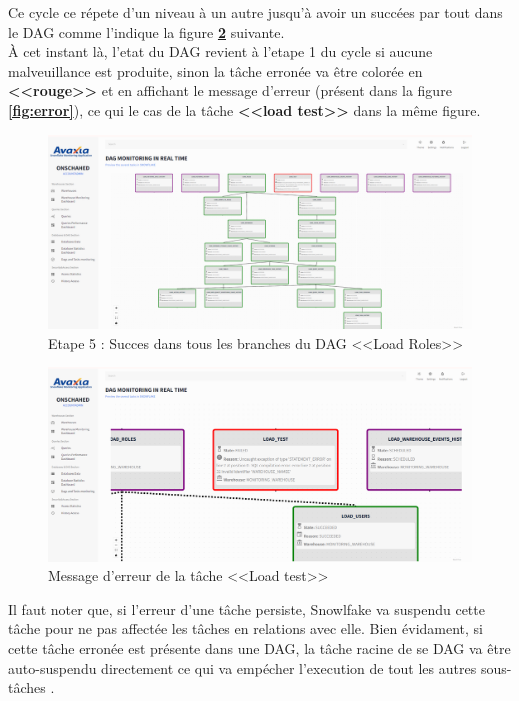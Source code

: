 \par Ce cycle ce répete d'un niveau à un autre jusqu'à avoir un succées par tout dans le DAG comme l'indique la figure \textbf{\ref{fig:final}} suivante.\\
 À cet instant là, l'etat du DAG revient à l'etape 1 du cycle si aucune malveuillance est produite, sinon la tâche erronée va être colorée en \textbf{<<rouge>>}  et en affichant le message d'erreur (présent dans la figure \textbf{\ref{fig:error}}), ce qui le cas de la tâche \textbf{<<load test>>} dans la même figure. 
\begin{figure}[H]
    \centering
    \includegraphics[width =1\linewidth]{img/captures/dag/final/failed.png}
    \caption{Etape 5 : Succes dans tous les branches du DAG <<Load Roles>>}
    \label{fig:final}
    \end{figure}
    \begin{figure}[H]
        \centering
        \includegraphics[width =1\linewidth]{img/captures/dag/final/reason.png}
        \caption{Message d'erreur de la tâche <<Load test>>}
        \label{fig:final}
        \end{figure}
\par Il faut noter que, si l'erreur d'une tâche persiste, Snowlfake va suspendu cette tâche pour ne pas affectée les tâches en relations avec elle. 
Bien évidament, si cette tâche erronée est présente dans une DAG, la tâche racine de se DAG va être auto-suspendu directement ce qui va empécher l'execution de tout les autres sous-tâches \cite{auto}. 
